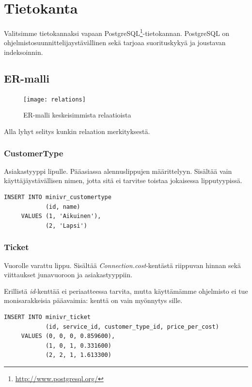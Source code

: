 \documentclass[a4paper,twoside,titlepage,12pt]{article}
\begin{document}
\lstset{language=SQL}

\section{Tietokanta}

Valitsimme tietokannaksi vapaan PostgreSQL\footnote{\url{http://www.postgresql.org/}}-tietokannan. PostgreSQL on ohjelmistosuunnittelijaystävällinen sekä tarjoaa suorituskykyä ja joustavan indeksoinnin.

\subsection{ER-malli}

\begin{figure}
  \texttt{[image: relations]}
  \caption{ER-malli keskeisimmista relaatioista}
\end{figure}

Alla lyhyt selitys kunkin relaation merkityksestä.

\subsubsection{CustomerType}

Asiakastyyppi lipulle. Pääasiassa alennuslippujen määrittelyyn. Sisältää vain
käyttäjäystävällisen nimen, jotta sitä ei tarvitse toistaa jokaisessa
lipputyypissä.

\begin{lstlisting}
INSERT INTO minivr_customertype
            (id, name)
     VALUES (1, 'Aikuinen'),
            (2, 'Lapsi')
\end{lstlisting}

\subsubsection{Ticket}

Vuorolle varattu lippu. Sisältää \emph{Connection.cost}-kentästä riippuvan
hinnan sekä viittaukset junavuoroon ja asiakastyyppiin.

Erillistä \emph{id}-kenttää ei periaatteessa tarvita, mutta käyttämämme
ohjelmisto ei tue monisarakkeisia pääavaimia: kenttä on vain myönnytys sille.

\begin{lstlisting}
INSERT INTO minivr_ticket
            (id, service_id, customer_type_id, price_per_cost)
     VALUES (0, 0, 0, 0.859600),
            (1, 0, 1, 0.331600)
            (2, 2, 1, 1.613300)
\end{lstlisting}
\end{document}
